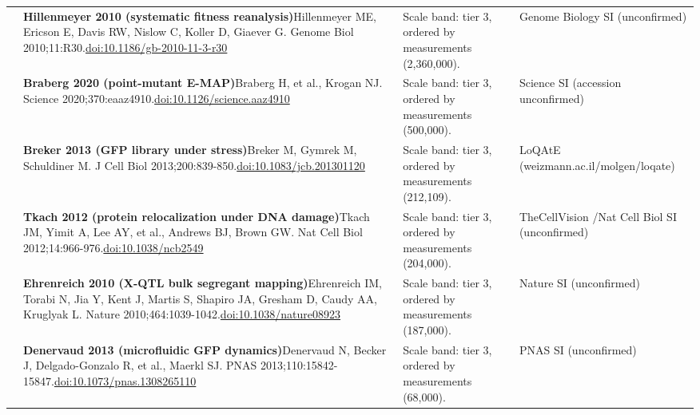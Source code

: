 \begin{landscape}
\begin{longtable}{@{}r@{\hspace{4pt}} L{86mm} L{92mm} L{62mm}@{}}
 & \textbf{Hillenmeyer 2010 (systematic fitness reanalysis)}\newline Hillenmeyer ME, Ericson E, Davis RW, Nislow C, Koller D, Giaever G. Genome Biol 2010;11:R30.\newline \href{https://doi.org/10.1186/gb-2010-11-3-r30}{doi:10.1186/\allowbreak gb-2010-11-3-r30} & Scale band: tier 3, ordered by measurements (2,360,000). & Genome Biology SI (unconfirmed) \\
 & \textbf{Braberg 2020 (point-mutant E-MAP)}\newline Braberg H, et al., Krogan NJ. Science 2020;370:eaaz4910.\newline \href{https://doi.org/10.1126/science.aaz4910}{doi:10.1126/\allowbreak science.aaz4910} & Scale band: tier 3, ordered by measurements (500,000). & Science SI (accession unconfirmed) \\
 & \textbf{Breker 2013 (GFP library under stress)}\newline Breker M, Gymrek M, Schuldiner M. J Cell Biol 2013;200:839-850.\newline \href{https://doi.org/10.1083/jcb.201301120}{doi:10.1083/\allowbreak jcb.201301120} & Scale band: tier 3, ordered by measurements (212,109). & LoQAtE (weizmann.ac.il/\allowbreak molgen/\allowbreak loqate) \\
 & \textbf{Tkach 2012 (protein relocalization under DNA damage)}\newline Tkach JM, Yimit A, Lee AY, et al., Andrews BJ, Brown GW. Nat Cell Biol 2012;14:966-976.\newline \href{https://doi.org/10.1038/ncb2549}{doi:10.1038/\allowbreak ncb2549} & Scale band: tier 3, ordered by measurements (204,000). & TheCellVision /\allowbreak  Nat Cell Biol SI (unconfirmed) \\
 & \textbf{Ehrenreich 2010 (X-QTL bulk segregant mapping)}\newline Ehrenreich IM, Torabi N, Jia Y, Kent J, Martis S, Shapiro JA, Gresham D, Caudy AA, Kruglyak L. Nature 2010;464:1039-1042.\newline \href{https://doi.org/10.1038/nature08923}{doi:10.1038/\allowbreak nature08923} & Scale band: tier 3, ordered by measurements (187,000). & Nature SI (unconfirmed) \\
 & \textbf{Denervaud 2013 (microfluidic GFP dynamics)}\newline Denervaud N, Becker J, Delgado-Gonzalo R, et al., Maerkl SJ. PNAS 2013;110:15842-15847.\newline \href{https://doi.org/10.1073/pnas.1308265110}{doi:10.1073/\allowbreak pnas.1308265110} & Scale band: tier 3, ordered by measurements (68,000). & PNAS SI (unconfirmed) \\

\end{longtable}
\end{landscape}
